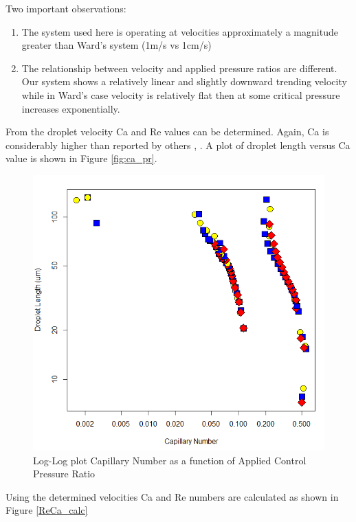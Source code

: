 \clearpage

Two important observations:
\begin{enumerate}
\item The system used here is operating at velocities approximately a magnitude greater than Ward's system (1m/s vs 1cm/s)
\item The relationship between velocity and applied pressure ratios are different. Our system shows a relatively linear and slightly downward trending velocity while in Ward's case velocity is relatively flat then at some critical pressure increases exponentially.
\end{enumerate}


From the droplet velocity Ca and Re values can be determined. Again, Ca is considerably higher than reported by others \cite{DeMenech2008}, \cite{Ward2005} . A plot of droplet length versus Ca value is shown in Figure \vref{fig:ca_pr}.

\begin{figure}[h]
\centering 
\includegraphics[width=0.750\columnwidth]{ca_pr.PNG} 
\caption[Capillary Number as a function of Applied Control Pressure Ratio]{Log-Log plot Capillary Number as a function of Applied Control Pressure Ratio }
\label{fig:ca_pr} 
\end{figure}


Using the determined velocities Ca and Re numbers are calculated as shown in Figure \vref{ReCa_calc}

